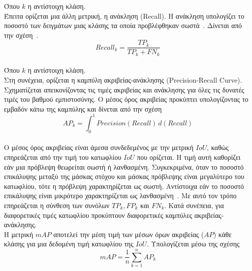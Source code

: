 \documentclass[12pt]{article}
\numberwithin{equation}{section}
\begin{document}
\noindent Όπου \(k\) η αντίστοιχη κλάση.\\

\noindent Έπειτα ορίζεται μια άλλη μετρική, η ανάκληση (Recall). Η ανάκληση υπολογίζει το ποσοστό των δειγμάτων μιας κλάσης τα οποία προβλέφθηκαν σωστά~\cite{Bex2021MulticlassMetrics}. Δίνεται από την σχέση~\cite{grandini2020metricsmulticlassclassificationoverview}.\\

\begin{equation}
Recall_k = \frac{TP_k}{TP_k + FN_k}
\end{equation}\\

\noindent Όπου \(k\) η αντίστοιχη κλάση.\\

Στη συνέχεια, ορίζεται η καμπύλη ακριβείας-ανάκλησης (Precision-Recall Curve). Σχηματίζεται απεικονίζοντας τις τιμές ακριβείας και ανάκλησης για όλες τις δυνατές τιμές του βαθμού εμπιστοσύνης. Ο μέσος όρος ακριβείας προκύπτει υπολογίζοντας το εμβαδόν κάτω της καμπύλης και δίνεται από την σχέση\\

\begin{equation}
AP_k = \int_{0}^{1} Precision(Recall) \, d(Recall)
\end{equation} \\

Ο μέσος όρος ακριβείας είναι άμεσα συνδεδεμένος με την μετρική \(IoU\), καθώς επηρεάζεται από την τιμή του κατωφλίου \(IoU\) που ορίζεται. Η τιμή αυτή καθορίζει εάν μια πρόβλεψη θεωρείται σωστή ή λανθασμένη. Συγκεκριμένα, όταν το ποσοστό επικάλυψης μεταξύ της μάσκας στόχου και μάσκας πρόβλεψης είναι μεγαλύτερο του κατωφλίου, τότε η πρόβλεψη χαρακτηρίζεται ως σωστή. Αντίστοιχα εάν το ποσοστό επικάλυψης είναι μικρότερο χαρακτηρίζεται ως λανθασμένη~\cite{Kirillov_2019_CVPR}. Με αυτό τον τρόπο επηρεάζεται η σύνθεση των συνόλων \(TP_k, FP_k\) και \(FN_k\). Κατά συνέπεια, για διαφορετικές τιμές κατωφλίου προκύπτουν διαφορετικές καμπύλες ακριβείας-ανάκλησης. \\

Η μετρική \(mAP\) αποτελεί την μέση τιμή των μέσων όρων ακριβείας (\(AP\)) κάθε κλάσης για μια δεδομένη τιμή κατωφλίου της \(IoU\). Υπολογίζεται μέσω της σχέσης \\

\begin{equation}
mAP = \frac{1}{n} \sum_{k=1}^{n} AP_k
\end{equation}\\
\end{document}
